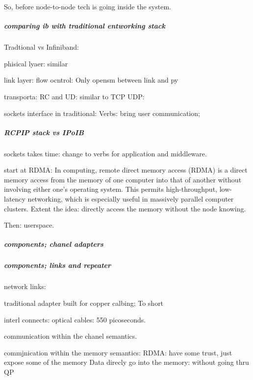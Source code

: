 \documentclass[12pt]{article}
\begin{document}
So, before node-to-node tech is going inside the system.

\subparagraph{comparing ib with traditional entworking stack}
Tradtional vs Infiniband: 

phisical lyaer: similar

link layer: flow ocntrol:
Only opensm between link and py

transporta: RC and UD: similar to TCP UDP:

sockets interface in traditional: Verbs: bring user communication;

\subparagraph{RCPIP stack vs IPoIB}

sockets takes time: change to verbs for application and middleware.

start at RDMA: In computing, remote direct memory access (RDMA) is a direct memory access from the memory of one computer into that of another without involving either one's operating system. This permits high-throughput, low-latency networking, which is especially useful in massively parallel computer clusters.
Extent the idea: directly access the memory without the node knowing.

Then: userspace.

\subparagraph{components; chanel adapters}

\subparagraph{components; links and repeater}
network links:

traditional adapter built for copper calbing; To short


interl connects: optical cables: 550 picoseconds.


communication within the chanel semantics.

commjnication within the memory semantics:
RDMA: have some trust, just expose some of the memory
Data direcly go into the memory: without going thru QP
\end{document}
